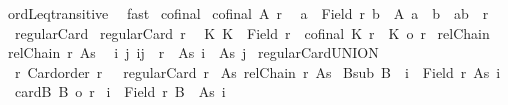 \begin{isabellebody}
ordLeq{\isacharunderscore}{\kern0pt}transitive\ \isamarkupfalse%
\ fast%
\endisatagproof
{\isafoldproof}%
%
\isadelimproof
%
\endisadelimproof
%
\isadelimdocument
%
\endisadelimdocument
%
\isatagdocument
%
\isamarkuptrue%
%
\endisatagdocument
{\isafolddocument}%
%
\isadelimdocument
%
\endisadelimdocument
{}\isamarkupfalse%
\ cofinal\ \isanewline
{\isachardoublequoteopen}cofinal\ A\ r\ {\isasymequiv}\isanewline
\ {\isasymforall}a\ {\isasymin}\ Field\ r{\isachardot}{\kern0pt}\ {\isasymexists}b\ {\isasymin}\ A{\isachardot}{\kern0pt}\ a\ {\isasymnoteq}\ b\ {\isasymand}\ {\isacharparenleft}{\kern0pt}a{\isacharcomma}{\kern0pt}b{\isacharparenright}{\kern0pt}\ {\isasymin}\ r{\isachardoublequoteclose}\isanewline
\isanewline
{}\isamarkupfalse%
\ regularCard\ \isanewline
{\isachardoublequoteopen}regularCard\ r\ {\isasymequiv}\isanewline
\ {\isasymforall}K{\isachardot}{\kern0pt}\ K\ {\isasymle}\ Field\ r\ {\isasymand}\ cofinal\ K\ r\ {\isasymlongrightarrow}\ {\isacharbar}{\kern0pt}K{\isacharbar}{\kern0pt}\ {\isacharequal}{\kern0pt}o\ r{\isachardoublequoteclose}\isanewline
\isanewline
{}\isamarkupfalse%
\ relChain\ \isanewline
{\isachardoublequoteopen}relChain\ r\ As\ {\isasymequiv}\isanewline
\ {\isasymforall}i\ j{\isachardot}{\kern0pt}\ {\isacharparenleft}{\kern0pt}i{\isacharcomma}{\kern0pt}j{\isacharparenright}{\kern0pt}\ {\isasymin}\ r\ {\isasymlongrightarrow}\ As\ i\ {\isasymle}\ As\ j{\isachardoublequoteclose}\isanewline
\isanewline
{}\isamarkupfalse%
\ regularCard{\isacharunderscore}{\kern0pt}UNION{\isacharcolon}{\kern0pt}\isanewline
{}\ r{\isacharcolon}{\kern0pt}\ {\isachardoublequoteopen}Card{\isacharunderscore}{\kern0pt}order\ r{\isachardoublequoteclose}\ \ \ {\isachardoublequoteopen}regularCard\ r{\isachardoublequoteclose}\isanewline
{}\ As{\isacharcolon}{\kern0pt}\ {\isachardoublequoteopen}relChain\ r\ As{\isachardoublequoteclose}\isanewline
{}\ Bsub{\isacharcolon}{\kern0pt}\ {\isachardoublequoteopen}B\ {\isasymle}\ {\isacharparenleft}{\kern0pt}{\isasymUnion}i\ {\isasymin}\ Field\ r{\isachardot}{\kern0pt}\ As\ i{\isacharparenright}{\kern0pt}{\isachardoublequoteclose}\isanewline
{}\ cardB{\isacharcolon}{\kern0pt}\ {\isachardoublequoteopen}{\isacharbar}{\kern0pt}B{\isacharbar}{\kern0pt}\ {\isacharless}{\kern0pt}o\ r{\isachardoublequoteclose}\isanewline
{}\ {\isachardoublequoteopen}{\isasymexists}i\ {\isasymin}\ Field\ r{\isachardot}{\kern0pt}\ B\ {\isasymle}\ As\ i{\isachardoublequoteclose}\isanewline

\end{isabellebody}
